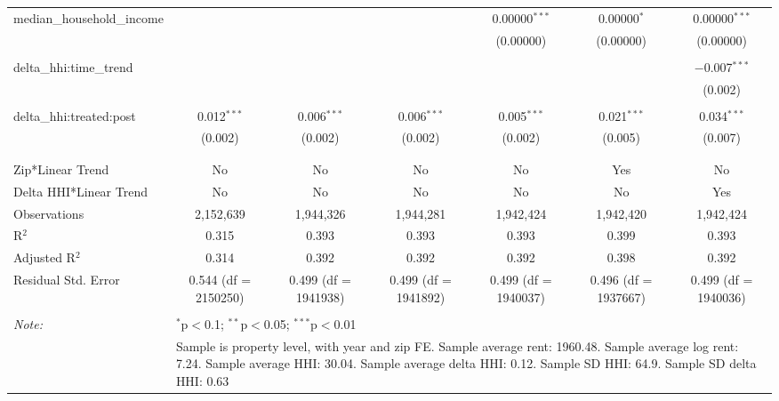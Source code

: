 \begin{table}[H]
{\begin{tabular}{@{\extracolsep{5pt}}lcccccc}
  median\_household\_income &  &  &  & 0.00000$^{***}$ & 0.00000$^{*}$ & 0.00000$^{***}$ \\  

   &  &  &  & (0.00000) & (0.00000) & (0.00000) \\  

   & & & & & & \\  

  delta\_hhi:time\_trend &  &  &  &  &  & $-$0.007$^{***}$ \\  

   &  &  &  &  &  & (0.002) \\  

   & & & & & & \\  

  delta\_hhi:treated:post & 0.012$^{***}$ & 0.006$^{***}$ & 0.006$^{***}$ & 0.005$^{***}$ & 0.021$^{***}$ & 0.034$^{***}$ \\  

   & (0.002) & (0.002) & (0.002) & (0.002) & (0.005) & (0.007) \\  

   & & & & & & \\  

 \hline \\[-1.8ex]  

 Zip*Linear Trend & No & No & No & No & Yes & No \\  

 Delta HHI*Linear Trend & No & No & No & No & No & Yes \\  

 Observations & 2,152,639 & 1,944,326 & 1,944,281 & 1,942,424 & 1,942,420 & 1,942,424 \\  

 R$^{2}$ & 0.315 & 0.393 & 0.393 & 0.393 & 0.399 & 0.393 \\  

 Adjusted R$^{2}$ & 0.314 & 0.392 & 0.392 & 0.392 & 0.398 & 0.392 \\  

 Residual Std. Error & 0.544 (df = 2150250) & 0.499 (df = 1941938) & 0.499 (df = 1941892) & 0.499 (df = 1940037) & 0.496 (df = 1937667) & 0.499 (df = 1940036) \\  

 \hline  

 \hline \\[-1.8ex]  

 \textit{Note:}  & \multicolumn{6}{l}{$^{*}$p$<$0.1; $^{**}$p$<$0.05; $^{***}$p$<$0.01} \\  

  & \multicolumn{6}{l}{Sample is property level, with year and zip FE. Sample average rent: 1960.48. Sample average log rent: 7.24. Sample average HHI: 30.04. Sample average delta HHI: 0.12. Sample SD HHI: 64.9. Sample SD delta HHI: 0.63} \\  

 \end{tabular}}  

 \end{table}  


